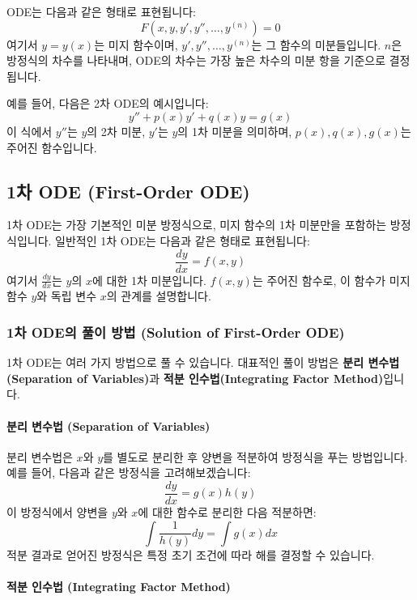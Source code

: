 \documentclass[12pt]{article}
\begin{document}
\noindent ODE는 다음과 같은 형태로 표현됩니다:
\[
  F(x, y, y', y'', \dots, y^{(n)}) = 0
\]
여기서 \( y = y(x) \)는 미지 함수이며, \( y', y'', \dots, y^{(n)} \)는 그 함수의 미분들입니다. \( n \)은 방정식의 차수를 나타내며, ODE의 차수는 가장 높은 차수의 미분 항을 기준으로 결정됩니다.

\noindent 예를 들어, 다음은 2차 ODE의 예시입니다:
\[
  y'' + p(x)y' + q(x)y = g(x)
\]
이 식에서 \( y'' \)는 \( y \)의 2차 미분, \( y' \)는 \( y \)의 1차 미분을 의미하며, \( p(x), q(x), g(x) \)는 주어진 함수입니다.

\subsection{1차 ODE (First-Order ODE)}

\noindent 1차 ODE는 가장 기본적인 미분 방정식으로, 미지 함수의 1차 미분만을 포함하는 방정식입니다. 일반적인 1차 ODE는 다음과 같은 형태로 표현됩니다:
\[
  \frac{dy}{dx} = f(x, y)
\]
여기서 \( \frac{dy}{dx} \)는 \( y \)의 \( x \)에 대한 1차 미분입니다. \( f(x, y) \)는 주어진 함수로, 이 함수가 미지 함수 \( y \)와 독립 변수 \( x \)의 관계를 설명합니다.

\subsubsection{1차 ODE의 풀이 방법 (Solution of First-Order ODE)}

\noindent 1차 ODE는 여러 가지 방법으로 풀 수 있습니다. 대표적인 풀이 방법은 \textbf{분리 변수법(Separation of Variables)}과 \textbf{적분 인수법(Integrating Factor Method)}입니다.

\paragraph{분리 변수법 (Separation of Variables)}

\noindent 분리 변수법은 \( x \)와 \( y \)를 별도로 분리한 후 양변을 적분하여 방정식을 푸는 방법입니다. 예를 들어, 다음과 같은 방정식을 고려해보겠습니다:
\[
  \frac{dy}{dx} = g(x)h(y)
\]
이 방정식에서 양변을 \( y \)와 \( x \)에 대한 함수로 분리한 다음 적분하면:
\[
  \int \frac{1}{h(y)} dy = \int g(x) dx
\]
적분 결과로 얻어진 방정식은 특정 초기 조건에 따라 해를 결정할 수 있습니다.

\paragraph{적분 인수법 (Integrating Factor Method)}
\end{document}
